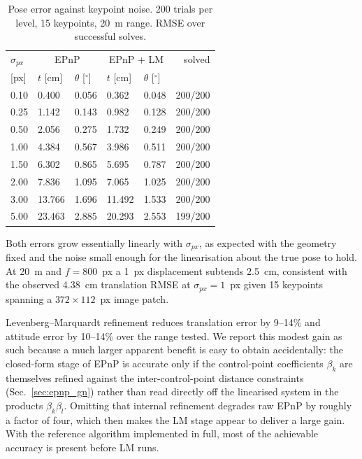 \begin{table}[!tb]
\caption{Pose error against keypoint noise. 200 trials per level, 15
keypoints, 20~m range. RMSE over successful solves.}
\label{tab:pose_noise}
\centering
\begin{tabular}{lllllr}
\hline
$\sigma_{px}$ & \multicolumn{2}{c}{EPnP} & \multicolumn{2}{c}{EPnP + LM} & solved \\
{}[px] & $t$ [cm] & $\theta$ [$^\circ$] & $t$ [cm] & $\theta$ [$^\circ$] & \\
\hline
0.10 & 0.400  & 0.056 & 0.362  & 0.048 & 200/200 \\
0.25 & 1.142  & 0.143 & 0.982  & 0.128 & 200/200 \\
0.50 & 2.056  & 0.275 & 1.732  & 0.249 & 200/200 \\
1.00 & 4.384  & 0.567 & 3.986  & 0.511 & 200/200 \\
1.50 & 6.302  & 0.865 & 5.695  & 0.787 & 200/200 \\
2.00 & 7.836  & 1.095 & 7.065  & 1.025 & 200/200 \\
3.00 & 13.766 & 1.696 & 11.492 & 1.533 & 200/200 \\
5.00 & 23.463 & 2.885 & 20.293 & 2.553 & 199/200 \\
\hline
\end{tabular}
\end{table}

Both errors grow essentially linearly with $\sigma_{px}$, as expected with the
geometry fixed and the noise small enough for the linearisation about the
true pose to hold. At 20~m and $f = 800$~px a 1~px displacement subtends
2.5~cm, consistent with the observed 4.38~cm translation RMSE at
$\sigma_{px} = 1$~px given 15 keypoints spanning a $372 \times 112$~px image
patch.

Levenberg--Marquardt refinement reduces translation error by 9--14\% and
attitude error by 10--14\% over the range tested. We report this modest gain
as such because a much larger apparent benefit is easy to obtain
accidentally: the closed-form stage of EPnP is accurate only if the
control-point coefficients $\beta_k$ are themselves refined against the
inter-control-point distance constraints (Sec.~\ref{sec:epnp_gn}) rather than
read directly off the linearised system in the products $\beta_k\beta_l$.
Omitting that internal refinement degrades raw EPnP by roughly a factor of
four, which then makes the LM stage appear to deliver a large gain. With the
reference algorithm implemented in full, most of the achievable accuracy is
present before LM runs.

